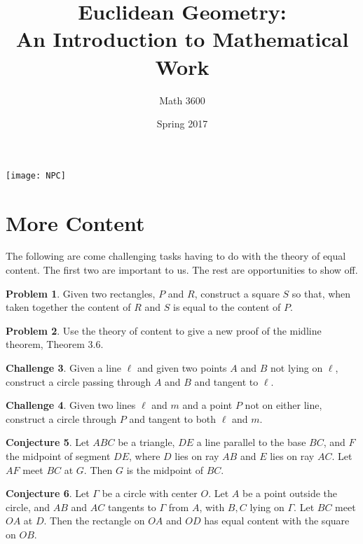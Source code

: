 \documentclass{tufte-handout}
\title{Euclidean Geometry:\\An Introduction to Mathematical Work}
\author[]{Math 3600}
\date{Spring 2017}
\theoremstyle{definition}
\newtheorem{problem}{Problem}[section]
\newtheorem{conjecture}[problem]{Conjecture}
\newtheorem{challenge}[problem]{Challenge}
\begin{document}
\maketitle

\begin{marginfigure}
    \texttt{[image: NPC]}
\end{marginfigure}

\setcounter{section}{14}
\section{More Content}

The following are come challenging tasks having to do with the theory of equal content.
The first two are important to us.
The rest are opportunities to show off.

\begin{problem}\label{prob:subtract-rect}
Given two rectangles, $P$ and $R$, construct a square $S$ so that, when taken together the content of $R$ and $S$ is equal to the content of $P$.
\end{problem}

\begin{problem} \label{conj:parallel-in-triangle} Use the theory of content to give a new proof of the midline theorem, Theorem 3.6.
\end{problem}

\begin{challenge}\label{chal:circle-given-two-points-tangent}
Given a line $\ell$ and given two points $A$ and $B$ not lying on $\ell$, construct a circle passing through $A$ and $B$ and tangent to $\ell$.
\end{challenge}

\begin{challenge}\label{chal:circle-point-two-tangents}
Given two lines $\ell$ and $m$ and a point $P$ not on either line, construct a circle through $P$ and tangent to both $\ell$ and $m$.
\end{challenge}

\begin{conjecture}\label{conj:content-triangle}
Let $ABC$ be a triangle, $DE$ a line parallel to the base $BC$, and $F$ the midpoint of segment $DE$, where $D$ lies on ray $AB$ and $E$ lies on ray $AC$. Let $AF$ meet $BC$ at $G$. Then $G$ is the midpoint of $BC$.
\end{conjecture}


\begin{conjecture}\label{conj:content-circle}
Let $\Gamma$ be a circle with center $O$. Let $A$ be a point outside the circle, and $AB$ and $AC$ tangents to $\Gamma$ from $A$, with $B, C$ lying on $\Gamma$. Let $BC$ meet $OA$ at $D$. Then the rectangle on $OA$ and $OD$ has equal content with the square on $OB$.
\end{conjecture}
\end{document}
